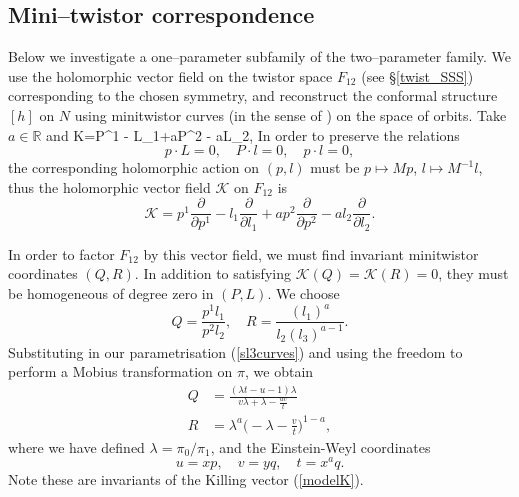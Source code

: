 \subsection{Mini--twistor correspondence}
\label{mini_twistor}
Below we investigate a one--parameter subfamily of the two--parameter family. We use the holomorphic vector field on 
the twistor space
$F_{12}$  (see \S\ref{twist_SSS})
corresponding to the chosen symmetry, and reconstruct the conformal structure $[h]$ on $N$ using minitwistor curves 
(in the sense of \cite{hitchin})
on the space of orbits. Take $a\in \mathbb{R}$ and
\be
\label{modelK}
K=P^1 - L_1+aP^2 - aL_2,
\ee
In order to preserve the relations
\[
p\cdot L=0,\quad P\cdot l=0,\quad p\cdot l=0, 
\]
the corresponding holomorphic action on $(p,l)$ must be $p\mapsto Mp$, $l\mapsto M^{-1}l$, thus the holomorphic vector field $\mathcal{K}$ on $F_{12}$ is
\[
\mathcal{K}=p^1\frac{\partial}{\partial p^1} - l_1\frac{\partial}{\partial l_1}+ap^2\frac{\partial}{\partial p^2} - al_2\frac{\partial}{\partial l_2}.
\]

In order to factor $F_{12}$ by this vector field, we must find invariant minitwistor coordinates $(Q,R)$. In addition to satisfying $\mathcal{K}(Q)=\mathcal{K}(R)=0$, they must be homogeneous of degree zero in $(P,L)$. We choose
\[
Q=\frac{p^1l_1}{p^2l_2},\quad R=\frac{(l_1)^a}{l_2(l_3)^{a-1}}.
\]
Substituting in our parametrisation (\ref{sl3curves}) and using the freedom to perform a Mobius transformation on $\pi$, we obtain
\begin{align}
\label{QR}
Q &= \frac{(\lambda t-u-1)\lambda}{v\lambda+\lambda-\frac{uv}{t}}\\
R &= \lambda^a\Big(-\lambda-\frac{v}{t}\Big)^{1-a},\nonumber
\end{align}
where we have defined $\lambda=\pi_0/\pi_1$, and the Einstein-Weyl coordinates
\[
u=xp,\quad v=yq, \quad t=x^aq.
\]
Note these are invariants of the Killing vector (\ref{modelK}).

